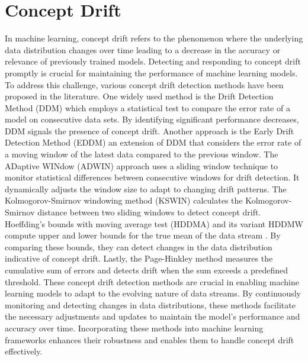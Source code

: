%
%
\section{Concept Drift}
\label{sec:3_1_concept_drift}
In machine learning, concept drift refers to the phenomenon where the underlying data distribution changes over time \cite{baena2006early, madkour2023historical, tan2022information} leading to a decrease in the accuracy or relevance of previously trained models. Detecting and responding to concept drift promptly is crucial for maintaining the performance of machine learning models. To address this challenge, various concept drift detection methods have been proposed in the literature. One widely used method is the Drift Detection Method (DDM)\cite{gama2004learning,bifet2009new} which employs a statistical test to compare the error rate of a model on consecutive data sets. By identifying significant performance decreases, DDM signals the presence of concept drift. Another approach is the Early Drift Detection Method (EDDM)\cite{gama2004learning,adams2023explainable} an extension of DDM that considers the error rate of a moving window of the latest data compared to the previous window. The ADaptive WINdow (ADWIN)\cite{gama2004learning,adams2023explainable}  approach uses a sliding window technique to monitor statistical differences between consecutive windows for drift detection. It dynamically adjusts the window size to adapt to changing drift patterns. The Kolmogorov-Smirnov windowing method (KSWIN) \cite{adams2023explainable} calculates the Kolmogorov-Smirnov distance between two sliding windows to detect concept drift. Hoeffding's bounds with moving average test (HDDMA) and its variant HDDMW compute upper and lower bounds for the true mean of the data stream \cite{gama2004learning,bifet2009new} . By comparing these bounds, they can detect changes in the data distribution indicative of concept drift. Lastly, the Page-Hinkley \cite{page1954continuous} method measures the cumulative sum of errors and detects drift when the sum exceeds a predefined threshold. These concept drift detection methods are crucial in enabling machine learning models to adapt to the evolving nature of data streams. By continuously monitoring and detecting changes in data distributions, these methods facilitate the necessary adjustments and updates to maintain the model's performance and accuracy over time. Incorporating these methods into machine learning frameworks enhances their robustness and enables them to handle concept drift effectively.

